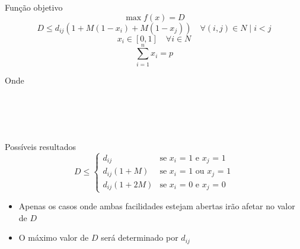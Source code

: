 \documentclass{beamer}
\begin{document}
\begin{frame}{Função objetivo}
\[\max f(x)=D\]
\[D \leqslant d_{ij}(1 + M(1 - x_i) + M(1 - x_j)) \quad\forall(i, j)\in{N}\mid{i<j}\]
\[x_i\in\left[0,1\right]\quad\forall{i}\in N\]
\[ \sum_{i=1}^{n} x_i = p \]


Onde\\
\\
\\
\\
\\
\end{frame}

\begin{frame}{Possíveis resultados}
\begin{equation*}
  D\leqslant
    \begin{cases}
      d_{ij}         & \text{se $x_i$ = 1 e $x_j$ = 1}\\
      d_{ij}(1 + M)  & \text{se $x_i$ = 1 ou $x_j$ = 1}\\
      d_{ij}(1 + 2M) & \text{se $x_i$ = 0 e $x_j$ = 0}
    \end{cases}       
\end{equation*}
\begin{itemize}
    \item Apenas os casos onde ambas facilidades estejam abertas irão afetar no valor de $D$
    \item O máximo valor de $D$ será determinado por $d_{ij}$
\end{itemize}
\end{frame}
\end{document}
